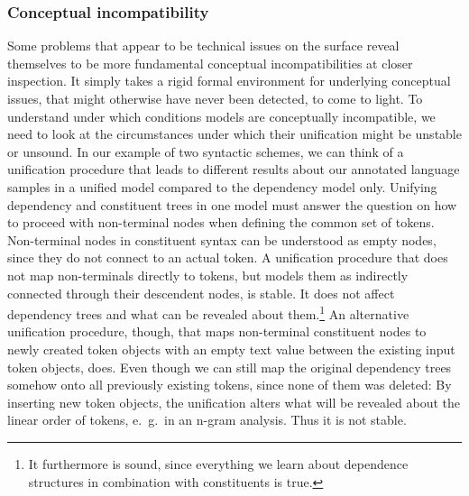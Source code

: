 \documentclass[output=paper,colorlinks,citecolor=brown]{langscibook}
\begin{document}
\subsubsection{Conceptual incompatibility}

Some problems that appear to be technical issues on the surface reveal themselves to be more fundamental conceptual incompatibilities at closer inspection.
It simply takes a rigid formal environment for underlying conceptual issues, that might otherwise have never been detected, to come to light.
To understand under which conditions models are conceptually incompatible, we need to look at the circumstances under which their unification might be unstable or unsound.
In our example of two syntactic schemes, we can think of a unification procedure that leads to different results about our annotated language samples in a unified model compared to the dependency model only.
Unifying dependency and constituent trees in one model must answer the question on how to proceed with non-terminal nodes when defining the common set of tokens.
Non-terminal nodes in constituent syntax can be understood as empty nodes, since they do not connect to an actual token.
A unification procedure that does not map non-terminals directly to tokens, but models them as indirectly connected through their descendent nodes, is stable.
It does not affect dependency trees and what can be revealed about them.\footnote{It furthermore is sound, since everything we learn about dependence structures in combination with constituents is true.}
An alternative unification procedure, though, that maps non-terminal constituent nodes to newly created token objects with an empty text value between the existing input token objects, does.
Even though we can still map the original dependency trees somehow onto all previously existing tokens, since none of them was deleted:
By inserting new token objects, the unification alters what will be revealed about the linear order of tokens, e.~g.\ in an n-gram analysis.
Thus it is not stable.
\end{document}
